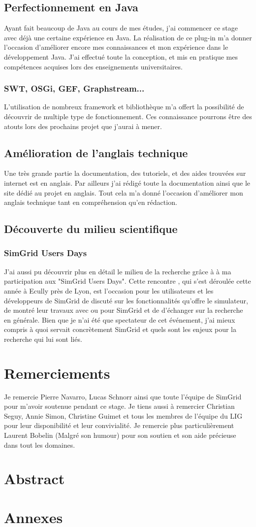 \documentclass{article}
\begin{document}
    \subsection{Perfectionnement en Java}
    Ayant fait beaucoup de Java au cours de mes études, j'ai commencer ce stage avec déjà une certaine expérience en Java. La réalisation de ce plug-in m'a donner l'occasion d'améliorer encore mes connaissances et mon expérience dans le développement Java. J'ai effectué toute la conception, et mis en pratique mes compétences acquises lors des enseignements universitaires.
        \subsubsection{SWT, OSGi, GEF, Graphstream...}
        L'utilisation de nombreux framework et bibliothèque m'a offert la possibilité de découvrir de multiple type de fonctionnement. Ces connaissance pourrons être des atouts lors des prochains projet que j'aurai à mener.
    \subsection{Amélioration de l'anglais technique}
    Une très grande partie la documentation, des tutoriels, et des aides trouvées sur internet est en anglais. Par ailleurs j'ai rédigé toute la documentation ainsi que le site dédié au projet en anglais. Tout cela m'a donné l'occasion d'améliorer mon anglais technique tant en compréhension qu'en rédaction.
    \subsection{Découverte du milieu scientifique}
    
        \subsubsection{SimGrid Users Days}
        J'ai aussi pu découvrir plus en détail le milieu de la recherche grâce à à ma participation aux "SimGrid Users Days". Cette rencontre , qui s'est déroulée cette année à Ecully près de Lyon, est l'occasion pour les utilisateurs et les développeurs de SimGrid de discuté sur les fonctionnalités qu'offre le simulateur, de montré leur travaux avec ou pour SimGrid et de d'échanger sur la recherche en générale. Bien que je n'ai été que spectateur de cet événement, j'ai mieux compris à quoi servait concrètement SimGrid et quels sont les enjeux pour la recherche qui lui sont liés.
\section{Remerciements}
Je remercie Pierre Navarro, Lucas Schnorr ainsi que toute l'équipe de SimGrid pour m'avoir soutenue pendant ce stage. Je tiens aussi à remercier Christian Seguy, Annie Simon, Christine Guimet et tous les membres de l'équipe du LIG pour leur disponibilité et leur convivialité. Je remercie plus particulièrement Laurent Bobelin (Malgré son humour) pour son soutien et son aide précieuse dans tout les domaines.
\section{Abstract}
\section{Annexes}
\end{document}
